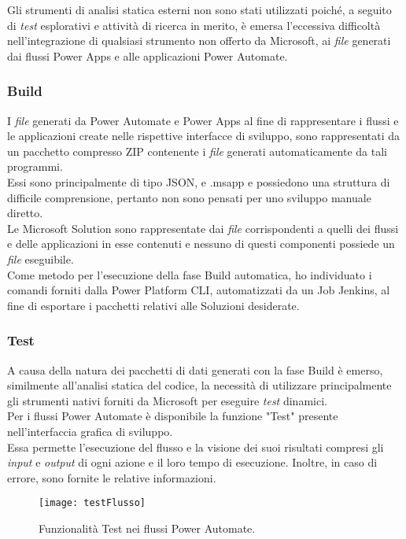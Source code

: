 \noindent Gli strumenti di analisi statica esterni non sono stati utilizzati poiché, a seguito di \emph{test} esplorativi e attività di ricerca in merito, è emersa l'eccessiva difficoltà nell'integrazione di qualsiasi strumento non offerto da Microsoft, ai \emph{file} generati dai flussi Power Apps e alle applicazioni Power Automate. 

\subsubsection*{Build}
I \emph{file} generati da Power Automate e Power Apps al fine di rappresentare i flussi e le applicazioni create nelle rispettive interfacce di sviluppo, sono rappresentati da un pacchetto compresso ZIP contenente i \emph{file} generati automaticamente da tali programmi.\\
Essi sono principalmente di tipo JSON, e .msapp e possiedono una struttura di difficile comprensione, pertanto non sono pensati per uno sviluppo manuale diretto.\\
Le Microsoft Solution sono rappresentate dai \emph{file} corrispondenti a quelli dei flussi e delle applicazioni in esse contenuti e nessuno di questi componenti possiede un \emph{file} eseguibile.\\
Come metodo per l'esecuzione della fase Build automatica, ho individuato i comandi forniti dalla Power Platform CLI, automatizzati da un Job Jenkins, al fine di esportare i pacchetti relativi alle Soluzioni desiderate. 

\subsubsection*{Test}
A causa della natura dei pacchetti di dati generati con la fase Build è emerso, similmente all'analisi statica del codice, la necessità di utilizzare principalmente gli strumenti nativi forniti da Microsoft per eseguire \emph{test} dinamici.\\
Per i flussi Power Automate è disponibile la funzione "Test" presente nell'interfaccia grafica di sviluppo.\\
Essa permette l'esecuzione del flusso e la visione dei suoi risultati compresi gli \emph{input} e \emph{output} di ogni azione e il loro tempo di esecuzione. 
Inoltre, in caso di errore, sono fornite le relative informazioni. 
\begin{figure}[htbp] 
    \centering 
    \texttt{[image: testFlusso]} 
    \caption{Funzionalità Test nei flussi Power Automate.}
    \label{fig:testFlusso}
\end{figure}

